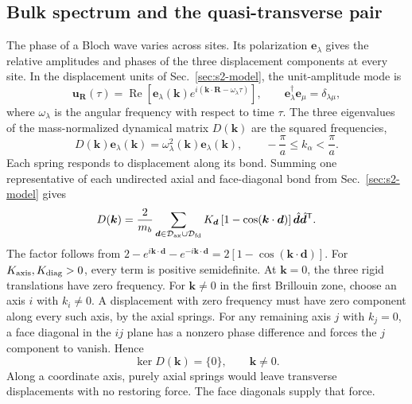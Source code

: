 \documentclass[10pt,aps,onecolumn,floatfix,notitlepage,nofootinbib,showkeys]{revtex4-2}
\newcommand{\vk}{\bm{k}}
\newcommand{\ve}{\bm{e}}
\newcommand{\vu}{\bm{u}}
\newcommand{\vR}{\bm{R}}
\begin{document}
\subsection{Bulk spectrum and the quasi-transverse pair}
\label{sec:s4-bulk-spectrum}

The phase of a Bloch wave varies across sites. Its polarization $\ve_\lambda$ gives the relative amplitudes and phases of the three displacement components at every site. In the displacement units of Sec.~\ref{sec:s2-model}, the unit-amplitude mode is
\begin{equation}
  \vu_{\vR}(\tau)
  =\operatorname{Re}\!\left[
    \ve_\lambda(\vk)
    e^{i(\vk\cdot\vR-\omega_\lambda\tau)}
  \right],
  \qquad
  \ve_\lambda^\dagger\ve_\mu=\delta_{\lambda\mu},
  \label{eq:s4-bloch-convention}
\end{equation}
where $\omega_\lambda$ is the angular frequency with respect to time $\tau$. The three eigenvalues of the mass-normalized dynamical matrix $D(\vk)$ are the squared frequencies,
\begin{equation}
  D(\vk)\ve_\lambda(\vk)
  =\omega_\lambda^2(\vk)\ve_\lambda(\vk),
  \qquad
  -\frac{\pi}{a}\leq k_\alpha<\frac{\pi}{a}.
  \label{eq:s4-eigenproblem}
\end{equation}
Each spring responds to displacement along its bond. Summing one representative of each undirected axial and face-diagonal bond from Sec.~\ref{sec:s2-model} gives
\begin{equation}
  D(\vk)
  =\frac{2}{m_b}
   \sum_{\bm d\in\mathcal D_{\rm ax}\cup\mathcal D_{\rm fd}}
   K_{\bm d}
   \left[1-\cos(\vk\cdot\bm d)\right]
   \hat{\bm d}\hat{\bm d}^{\mathsf T}.
  \label{eq:s4-dynamical-matrix}
\end{equation}
The factor follows from
$2-e^{i\vk\cdot\bm d}-e^{-i\vk\cdot\bm d}
 =2[1-\cos(\vk\cdot\bm d)]$.
For $K_{\rm axis},K_{\rm diag}>0$, every term is positive semidefinite. At $\vk=0$, the three rigid translations have zero frequency. For $\vk\ne0$ in the first Brillouin zone, choose an axis $i$ with $k_i\ne0$. A displacement with zero frequency must have zero component along every such axis, by the axial springs. For any remaining axis $j$ with $k_j=0$, a face diagonal in the $ij$ plane has a nonzero phase difference and forces the $j$ component to vanish. Hence
\begin{equation}
  \ker D(\vk)=\{0\},
  \qquad \vk\neq0.
  \label{eq:s4-rigidity}
\end{equation}
Along a coordinate axis, purely axial springs would leave transverse displacements with no restoring force. The face diagonals supply that force.
\end{document}
